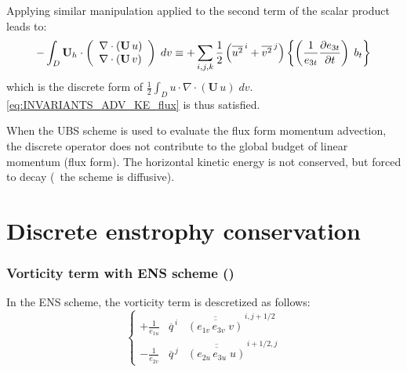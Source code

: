 \documentclass[../main/NEMO_manual]{subfiles}
\begin{document}
Applying similar manipulation applied to the second term of the scalar product leads to:
\[
  -  \int_D \textbf{U}_h \cdot     \left(                 {{
        \begin{array} {*{20}c}
          \nabla \cdot \left( \textbf{U}\,u \right) \hfill \\
          \nabla \cdot \left( \textbf{U}\,v \right) \hfill \\
        \end{array}
      } }           \right)   \;dv
  \equiv + \sum\limits_{i,j,k}  \frac{1}{2}  \left( \overline {u^2}^{\,i} + \overline {v^2}^{\,j} \right)
  \biggl\{     \left(   \frac{1}{e_{3t}} \frac{\partial e_{3t}}{\partial t}   \right) \; b_t     \biggr\}
\]
which is the discrete form of $ \frac{1}{2} \int_D u \cdot \nabla \cdot \left(   \textbf{U}\,u   \right) \; dv $.
\autoref{eq:INVARIANTS_ADV_KE_flux} is thus satisfied.

When the UBS scheme is used to evaluate the flux form momentum advection,
the discrete operator does not contribute to the global budget of linear momentum (flux form).
The horizontal kinetic energy is not conserved, but forced to decay (\ie\ the scheme is diffusive).

\section{Discrete enstrophy conservation}
\label{sec:INVARIANTS_4}

\subsubsection{Vorticity term with ENS scheme  (\protect{})}
\label{subsec:INVARIANTS_vorENS}

In the ENS scheme, the vorticity term is descretized as follows:
\begin{equation}
  \label{eq:INVARIANTS_dynvor_ens}
  \left\{
    \begin{aligned}
      +\frac{1}{e_{1u}} & \overline{q}^{\,i}  & {\overline{ \overline{\left( e_{1v}\,e_{3v}\;  v \right) } } }^{\,i, j+1/2}    \\
      - \frac{1}{e_{2v}} & \overline{q}^{\,j}  & {\overline{ \overline{\left( e_{2u}\,e_{3u}\; u \right) } } }^{\,i+1/2, j}
    \end{aligned}
  \right.
\end{equation}
\end{document}
